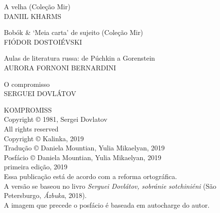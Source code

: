 \noindent{}A velha (Coleção Mir)\\
DANIIL KHARMS 
\medskip

\noindent{}Bobók \& `Meia carta' de sujeito (Coleção Mir)\\
FIÓDOR DOSTOIÉVSKI
\medskip

\noindent{}Aulas de literatura russa: de Púchkin a Gorenstein \\
AURORA FORNONI BERNARDINI
\medskip

\noindent{}O compromisso\\
SERGUEI DOVLÁTOV

\newpage
\pagestyle{empty}
\MyriadPro
\scriptsize
\begin{center}
KOMPROMISS\\[6pt]

Copyright © 1981, Sergei Dovlatov\\[6pt]

All rights reserved\\[20pt]

Copyright © Kalinka, 2019\\[6pt]

Tradução © Daniela Mountian, Yulia Mikaelyan, 2019\\[6pt]

Posfácio © Daniela Mountian, Yulia Mikaelyan, 2019\\[6pt]

primeira edição, 2019\\[40pt]


Essa publicação está de acordo com a reforma ortográfica.\\[6pt]
A versão se baseou no livro \emph{Serguei Dovlátov, sobránie sotchiniéni} (São Petersburgo, \emph{Ázbuka}, 2018).\\[6pt]	
A imagem que precede o posfácio é baseada em autocharge do autor.\\[20pt]
\end{center}


\bigskip

